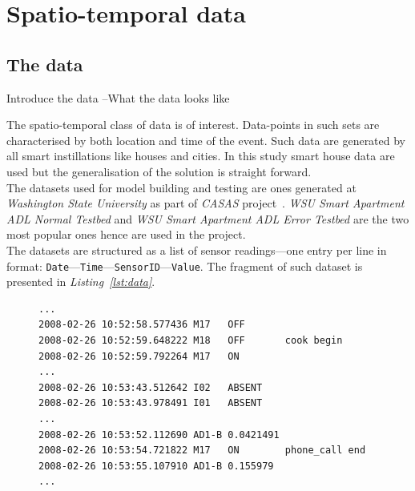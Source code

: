 \documentclass[12pt, a4paper, pdflatex, leqno, twoside, openright]{report}
\begin{document}
\chapter{Spatio-temporal data\label{ch:stData}}

  \section{The data}
Introduce the data
--What the data looks like

The spatio-temporal class of data is of interest. Data-points in such sets are characterised by both location and time of the event. Such data are generated by all smart instillations like houses and cities. In this study smart house data are used but the generalisation of the solution is straight forward.\\ %

The datasets used for model building and testing are ones generated at \emph{Washington State University} as part of \emph{CASAS} project~\citep{cook2009assessing}. \emph{WSU Smart Apartment ADL Normal Testbed} and \emph{WSU Smart Apartment ADL Error Testbed} are the two most popular ones hence are used in the project.\\

The datasets are structured as a list of sensor readings---one entry per line in format: \texttt{Date}---\texttt{Time}---\texttt{SensorID}---\texttt{Value}. The fragment of such dataset is presented in \emph{Listing~\ref{lst:data}}.

\begin{figure}
\lstset{
  captionpos=b,
  frame=single,
  language=HTML,
  breaklines=true,
  caption=CASAS dataset structure.,
  label=lst:data,
  float=tb
}
\begin{lstlisting}
...
2008-02-26 10:52:58.577436 M17   OFF
2008-02-26 10:52:59.648222 M18   OFF       cook begin
2008-02-26 10:52:59.792264 M17   ON
...
2008-02-26 10:53:43.512642 I02   ABSENT
2008-02-26 10:53:43.978491 I01   ABSENT
...
2008-02-26 10:53:52.112690 AD1-B 0.0421491
2008-02-26 10:53:54.721822 M17   ON        phone_call end
2008-02-26 10:53:55.107910 AD1-B 0.155979
...
\end{lstlisting}
\end{figure}
\end{document}
